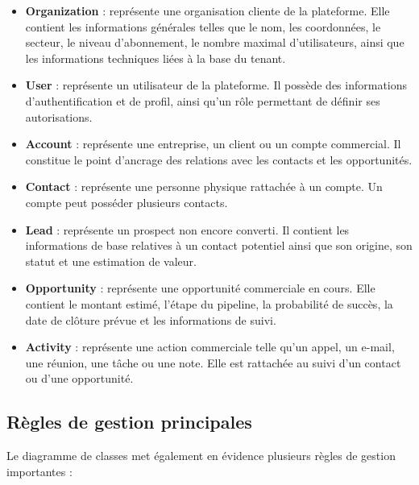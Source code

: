 \documentclass[12pt,a4paper]{report}
\begin{document}
\begin{itemize}
    \item \textbf{Organization} : représente une organisation cliente de la plateforme. Elle contient les informations générales telles que le nom, les coordonnées, le secteur, le niveau d’abonnement, le nombre maximal d’utilisateurs, ainsi que les informations techniques liées à la base du tenant.
    
    \item \textbf{User} : représente un utilisateur de la plateforme. Il possède des informations d’authentification et de profil, ainsi qu’un rôle permettant de définir ses autorisations.
    
    \item \textbf{Account} : représente une entreprise, un client ou un compte commercial. Il constitue le point d’ancrage des relations avec les contacts et les opportunités.
    
    \item \textbf{Contact} : représente une personne physique rattachée à un compte. Un compte peut posséder plusieurs contacts.
    
    \item \textbf{Lead} : représente un prospect non encore converti. Il contient les informations de base relatives à un contact potentiel ainsi que son origine, son statut et une estimation de valeur.
    
    \item \textbf{Opportunity} : représente une opportunité commerciale en cours. Elle contient le montant estimé, l’étape du pipeline, la probabilité de succès, la date de clôture prévue et les informations de suivi.
    
    \item \textbf{Activity} : représente une action commerciale telle qu’un appel, un e-mail, une réunion, une tâche ou une note. Elle est rattachée au suivi d’un contact ou d’une opportunité.
\end{itemize}

\subsection{Règles de gestion principales}

Le diagramme de classes met également en évidence plusieurs règles de gestion importantes :
\end{document}

